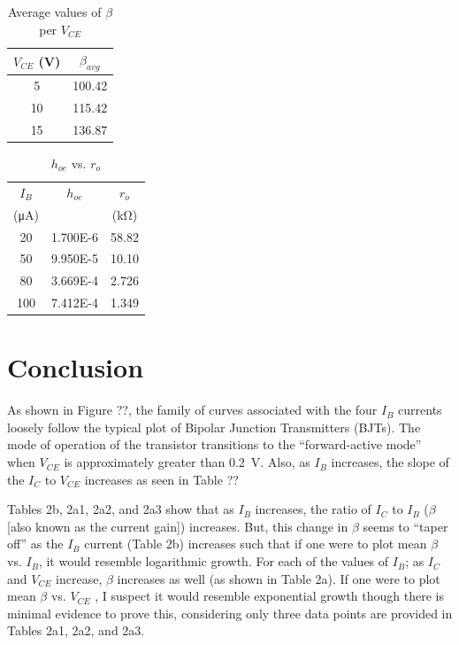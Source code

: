 \begin{table}[hbtp]
  \centering
  \begin{tabular}{cc}
    $V_{CE}$ (\si{V}) & $\beta_{avg}$ \\
    \hline
    5                 & 100.42        \\
    10                & 115.42        \\
    15                & 136.87        \\
  \end{tabular}
  \caption{\label{tab:beta_VCE} Average values of $\beta$ per $V_{CE}$}
\end{table}

\begin{table}[hbtp]
  \centering
  \begin{tabular}{ccc}
    $I_B$                & $h_{oe}$ & $r_o$            \\
    (\si{\micro\ampere}) &          & (\si{\kilo\ohm}) \\
    \hline
     20                  & 1.700E-6 & 58.82            \\
     50                  & 9.950E-5 & 10.10            \\
     80                  & 3.669E-4 & 2.726            \\
    100                  & 7.412E-4 & 1.349            \\
  \end{tabular}
  \caption{\label{tab:hoe} $h_{oe}$ vs. $r_o$}
\end{table}

\newpage
\section{Conclusion}
\label{sec:conclusion}

As shown in Figure ??, the family of curves associated with the four $I_B$ currents loosely follow the typical plot of Bipolar Junction Transmitters (BJTs).  The mode of operation of the transistor transitions to the “forward-active mode” when $V_{CE}$ is approximately greater than \SI{0.2}{V}.  Also, as $I_B$ increases, the slope of the $I_C$ to $V_{CE}$ increases as seen in Table ??

Tables 2b, 2a1, 2a2, and 2a3 show that as $I_B$ increases, the ratio of $I_C$ to $I_B$ ($\beta$ [also known as the current gain]) increases.  But, this change in $\beta$ seems to “taper off” as the $I_B$ current (Table 2b) increases such that if one were to plot mean $\beta$ vs. $I_B$, it would resemble logarithmic growth.  For each of the values of $I_B$; as $I_C$ and $V_{CE}$ increase, $\beta$ increases as well (as shown in Table 2a).  If one were to plot mean $\beta$ vs. $V_{CE}$ , I suspect it would resemble exponential growth though there is minimal evidence to prove this, considering only three data points are provided in Tables 2a1, 2a2, and 2a3.

